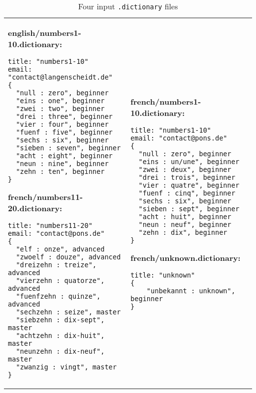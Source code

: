 \newpage
\begin{table}

\begin{tabular}{p{6cm} p{6cm} }
\footnotesize
\textbf{english/numbers1-10.dictionary:}
\begin{verbatim}
title: "numbers1-10"
email: "contact@langenscheidt.de"	
{
  "null : zero", beginner
  "eins : one", beginner
  "zwei : two", beginner
  "drei : three", beginner
  "vier : four", beginner
  "fuenf : five", beginner
  "sechs : six", beginner
  "sieben : seven", beginner
  "acht : eight", beginner
  "neun : nine", beginner
  "zehn : ten", beginner 
}
\end{verbatim} 

\vspace{0.5cm}

\footnotesize
\textbf{french/numbers11-20.dictionary:}
\begin{verbatim}
title: "numbers11-20"
email: "contact@pons.de"	
{
  "elf : onze", advanced
  "zwoelf : douze", advanced
  "dreizehn : treize", advanced
  "vierzehn : quatorze", advanced
  "fuenfzehn : quinze", advanced
  "sechzehn : seize", master
  "siebzehn : dix-sept", master
  "achtzehn : dix-huit", master
  "neunzehn : dix-neuf", master
  "zwanzig : vingt", master
}
\end{verbatim}
&

\footnotesize
\textbf{french/numbers1-10.dictionary:}
\begin{verbatim}   
title: "numbers1-10"
email: "contact@pons.de"	
{
  "null : zero", beginner
  "eins : un/une", beginner
  "zwei : deux", beginner
  "drei : trois", beginner
  "vier : quatre", beginner
  "fuenf : cinq", beginner
  "sechs : six", beginner
  "sieben : sept", beginner
  "acht : huit", beginner
  "neun : neuf", beginner
  "zehn : dix", beginner 
}
\end{verbatim}

\vspace{0.5cm}

\footnotesize
\textbf{french/unknown.dictionary:}
\begin{verbatim}
title: "unknown"
{
	"unbekannt : unknown", beginner
}
\end{verbatim}
  \\
\end{tabular}   
\caption{Four input \texttt{.dictionary} files}
\label{moca-inputdata}

\end{table}
\clearpage

